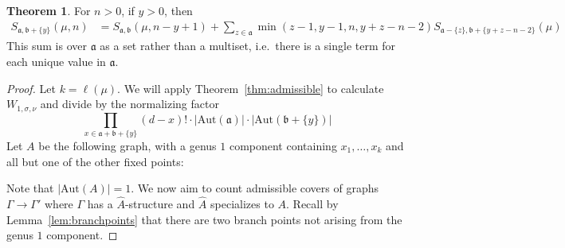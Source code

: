 \documentclass[11pt]{article}           %
\newcommand{\Aut}{\text{Aut}}
\renewcommand{\a}{\mathfrak a}
\renewcommand{\b}{\mathfrak b}
\theoremstyle{definition}
\newtheorem{thm}{Theorem}[section]
\begin{document}
\begin{thm}
  \label{thm:reduceb}
  For $n>0$, if $y>0$, then
  \begin{align*}
    S_{\mathfrak a,\mathfrak b+\{y\}}(\mu, n) &=S_{\mathfrak a,\mathfrak b}(\mu, n-y+1) +\sum_{z\in\mathfrak a}\min(z-1,y-1,n,y+z-n-2)S_{\mathfrak a-\{z\},\mathfrak b+\{y+z-n-2\}}(\mu)
  \end{align*}
  This sum is over $\a$ as a set rather than a multiset, i.e.\ there is
  a single term for each unique value in $\a$.
\end{thm}

\begin{proof}
  Let $k=\ell(\mu)$. We will apply Theorem~\ref{thm:admissible}
  to calculate $W_{1,\sigma,\nu}$ and divide by the normalizing factor
  \[ 
  \prod_{x\in\a+\b+\{y\}}(d-x)!\cdot |\Aut(\a)|\cdot |\Aut(\b+\{y\})|
  \]
  Let $A$ be the following graph,
  with a genus $1$ component containing $x_1,\dots,x_k$ and all but one
  of the other fixed points:


                  Note that $|\Aut(A)|=1$.
We now aim to count admissible covers of graphs $\Gamma\to\Gamma'$ where $\Gamma$ has a $\hat A$-structure and $\hat A$ specializes to $A$.
Recall by Lemma~\ref{lem:branchpoints} that there are two branch points not
  arising from the genus $1$ component.
  

\end{proof}
\end{document}
